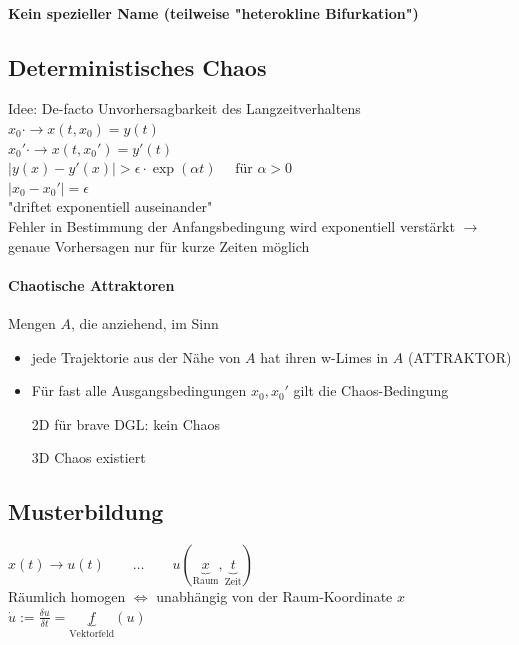 \paragraph{Kein spezieller Name (teilweise "heterokline Bifurkation")}

\subsection{Deterministisches Chaos}
Idee: De-facto Unvorhersagbarkeit des Langzeitverhaltens
$ x_0 \cdot \rightarrow x(t, x_0) = y(t) $ \\
$ x_0' \cdot \rightarrow x(t, x_0') = y'(t) $ \\
$ | y(x) - y'(x) | > \epsilon \cdot \exp(\alpha t) \quad \text{ für } \alpha > 0 $ \\
$ | x_0 - x_0' | = \epsilon $ \\
"driftet exponentiell auseinander" \\
Fehler in Bestimmung der Anfangsbedingung wird exponentiell verstärkt $\rightarrow$ genaue Vorhersagen nur für kurze Zeiten möglich
\paragraph{Chaotische Attraktoren}
Mengen $A$, die anziehend, im Sinn \\
\begin{itemize}
    \item jede Trajektorie aus der Nähe von $A$ hat ihren w-Limes in $A$ (ATTRAKTOR)
    \item Für fast alle Ausgangsbedingungen $x_0, x_0'$ gilt die Chaos-Bedingung
    \item[2D] für brave DGL: kein Chaos
    \item[3D] Chaos existiert
\end{itemize}

\subsection{Musterbildung}
$ x(t) \rightarrow u(t) \qquad \dots \qquad u(\underbrace{x}_{\text{Raum}}, \underbrace{t}_{\text{Zeit}}) $ \\  %
Räumlich homogen $\Leftrightarrow$ unabhängig von der Raum-Koordinate $x$ \\
$ \dot{u} := \frac{\delta u}{\delta t} = \underbrace{f}_{\text{Vektorfeld}}(u) $

